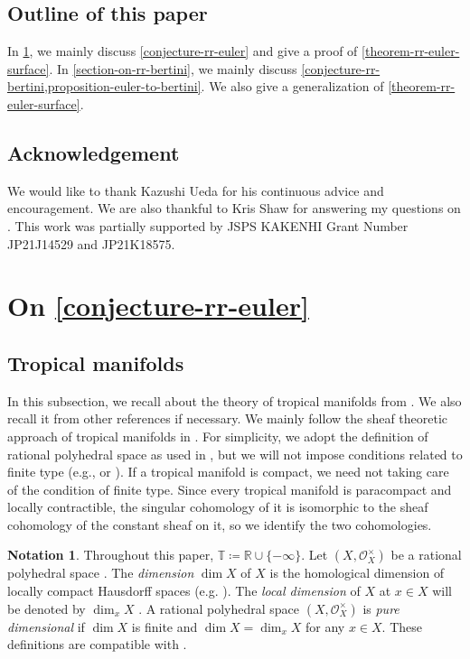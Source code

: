 \documentclass[a4paper,dvipdfmx,reqno,12pt]{amsart}
\theoremstyle{definition}
\newtheorem{notation}[theorem]{Notation}
\newcommand{\deq}{\coloneqq}
\numberwithin{equation}{section}
\begin{document}
\subsection{Outline of this paper}
In \cref{section-on-rr-euler}, we mainly
discuss \cref{conjecture-rr-euler} and
give a proof of \cref{theorem-rr-euler-surface}.
In \cref{section-on-rr-bertini}, we mainly
discuss \cref{conjecture-rr-bertini,proposition-euler-to-bertini}.
We also give a generalization of
\cref{theorem-rr-euler-surface}.

\subsection*{Acknowledgement}
We would like to thank Kazushi Ueda for his continuous advice
and encouragement. We are also thankful to Kris Shaw
for answering my questions on
\cite{shaw2015tropical,demedrano2023chern}.
This work was partially supported 
by JSPS KAKENHI Grant Number JP21J14529 and JP21K18575.

\section{On \cref{conjecture-rr-euler}}
\label{section-on-rr-euler}
\subsection{Tropical manifolds}
In this subsection, we recall about 
the theory of tropical manifolds from
\cite{shaw2011tropical,MR3330789,mikhalkin2018tropical,MR4637248,demedrano2023chern}.
We also recall it from other references if necessary.
We mainly follow the sheaf theoretic approach of
tropical manifolds in \cite{MR4637248}.
For simplicity, we adopt the definition of
rational polyhedral space
as used in \cite[Definition 6.1]{gross2019sheaftheoretic},
but we will not impose conditions related to finite type 
(e.g., \cite[Definition 7.1.14]{mikhalkin2018tropical} 
or \cite[Definition 2.3 (4)]{demedrano2023chern}).
If a tropical manifold is compact, we need not
taking care of the condition of finite type. 
Since every tropical manifold is paracompact and
locally contractible, the singular cohomology
of it is isomorphic to the sheaf cohomology
of the constant sheaf on it, so we identify
the two cohomologies.

\begin{notation}
Throughout this paper, $\mathbb{T}\deq 
\mathbb{R}\cup\{-\infty\}$.
Let $(X,\mathcal{O}_X^{\times})$ be a rational
polyhedral space \cite[Definition 2.2]{MR4246795}.
The \emph{dimension} $\dim X$ of $X$ is 
the homological dimension of locally compact
Hausdorff spaces (e.g.
\cite[Chapter III. Definition 9.4]{MR842190}).
The \emph{local dimension} of $X$ at $x\in X$
will be denoted by $\dim_x X$
\cite[Chapter III. Definition 9.10]{MR842190}.
A rational polyhedral space $(X,\mathcal{O}_X^{\times})$
is \emph{pure dimensional} if $\dim X$ is finite and
$\dim X=\dim_x X$ for any $x\in X$.
These definitions are compatible with
\cite[Definition 7.1.1]{mikhalkin2018tropical}.
\end{notation}
\end{document}
